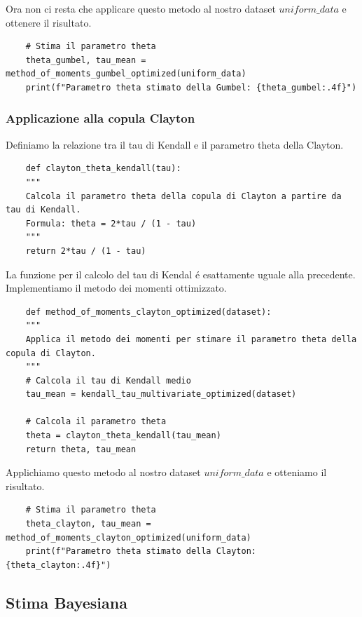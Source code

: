 \documentclass[%
	corpo=11pt,
    twoside,
    stile=classica,
    oldstyle,
    tipotesi=custom,
    greek,
    evenboxes,
]{toptesi}
\begin{document}
Ora non ci resta che applicare questo metodo al nostro dataset $uniform \_data$ e ottenere il risultato.

\begin{Verbatim}
	# Stima il parametro theta
	theta_gumbel, tau_mean = method_of_moments_gumbel_optimized(uniform_data)
	print(f"Parametro theta stimato della Gumbel: {theta_gumbel:.4f}")
\end{Verbatim}


\newpage
\subsubsection{Applicazione alla copula Clayton}

Definiamo la relazione tra il tau di Kendall e il parametro theta della Clayton.

\begin{verbatim}
	def clayton_theta_kendall(tau):
	"""
	Calcola il parametro theta della copula di Clayton a partire da tau di Kendall.
	Formula: theta = 2*tau / (1 - tau)
	"""
	return 2*tau / (1 - tau)
\end{verbatim}

La funzione per il calcolo del tau di Kendal é esattamente uguale alla precedente.\\

Implementiamo il metodo dei momenti ottimizzato.

\begin{Verbatim}
	def method_of_moments_clayton_optimized(dataset):
	"""
	Applica il metodo dei momenti per stimare il parametro theta della copula di Clayton.
	"""
	# Calcola il tau di Kendall medio
	tau_mean = kendall_tau_multivariate_optimized(dataset)
	
	# Calcola il parametro theta
	theta = clayton_theta_kendall(tau_mean)
	return theta, tau_mean
\end{Verbatim}

Applichiamo questo metodo al nostro dataset $uniform \_data$ e otteniamo il risultato.

\begin{Verbatim}
	# Stima il parametro theta
	theta_clayton, tau_mean = method_of_moments_clayton_optimized(uniform_data)
	print(f"Parametro theta stimato della Clayton: {theta_clayton:.4f}")
\end{Verbatim}


\newpage
\subsection{Stima Bayesiana}
\end{document}
